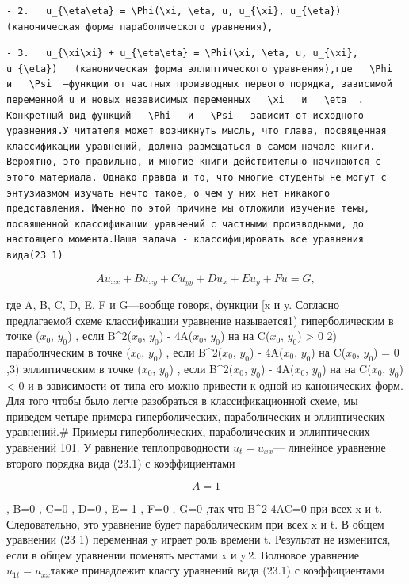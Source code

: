 \documentclass[
  ukrainian,
]{article}
\begin{document}
\begin{verbatim}
- 2.   u_{\eta\eta} = \Phi(\xi, \eta, u, u_{\xi}, u_{\eta})   (каноническая форма параболического уравнения),
\end{verbatim}

\begin{verbatim}
- 3.   u_{\xi\xi} + u_{\eta\eta} = \Phi(\xi, \eta, u, u_{\xi}, u_{\eta})   (каноническая форма эллиптического уравнения),где   \Phi   и   \Psi  —функции от частных производных первого порядка, зависимой переменной u и новых независимых переменных   \xi   и   \eta  . Конкретный вид функций   \Phi   и   \Psi   зависит от исходного уравнения.У читателя может возникнуть мысль, что глава, посвященная классификации уравнений, должна размещаться в самом начале книги. Вероятно, это правильно, и многие книги действительно начинаются с этого материала. Однако правда и то, что многие студенты не могут с энтузиазмом изучать нечто такое, о чем у них нет никакого представления. Именно по этой причине мы отложили изучение темы, посвященной классификации уравнений с частными производными, до настоящего момента.Наша задача - классифицировать все уравнения вида(23 1)
\end{verbatim}

\[
Au_{xx} + Bu_{xy} + Cu_{yy} + Du_x + Eu_y + Fu = G,
\]

где A, B, C, D, E, F и G---вообще говоря, функции {[}x и y. Согласно
предлагаемой схеме классификации уравнение называется1) гиперболическим
в точке (\(x_0\), \(y_0\)) , если B\^{}2(\(x_0\), \(y_0\)) - 4A(\(x_0\),
\(y_0\))  на  на C(\(x_0\), \(y_0\)) \textgreater{}
0 2) параболнческим в точке (\(x_0\), \(y_0\)) , если B\^{}2(\(x_0\),
\(y_0\)) - 4A(\(x_0\), \(y_0\))  на C(\(x_0\), \(y_0\)) = 0
,3) эллиптическим в точке (\(x_0\), \(y_0\)) , если B\^{}2(\(x_0\),
\(y_0\)) - 4A(\(x_0\), \(y_0\))  на  на C(\(x_0\),
\(y_0\)) \textless{} 0 и в зависимости от типа его можно привести к
одной из канонических форм. Для того чтобы было легче разобраться в
классификационной схеме, мы приведем четыре примера гиперболических,
параболических и эллиптических уравнений.\# Примеры гиперболических,
параболических и эллиптических уравнений 101. У равнение
теплопроводности \(u_t = u_{xx}\)--- линейное уравнение второго порядка
вида (23.1) с коэффициентами

\[
A=1
\]

, B=0 , C=0 , D=0 , E=-1 , F=0 , G=0 ,так что B\^{}2-4AC=0 при всех x и
t. Следовательно, это уравнение будет параболическим при всех x и t. В
общем уравнении (23 1) переменная y играет роль времени t. Результат не
изменится, если в общем уравнении поменять местами x и y.2. Волновое
уравнение \(u_{1t} = u_{xx}\)также принадлежит классу уравнений вида
(23.1) с коэффициентами
\end{document}
